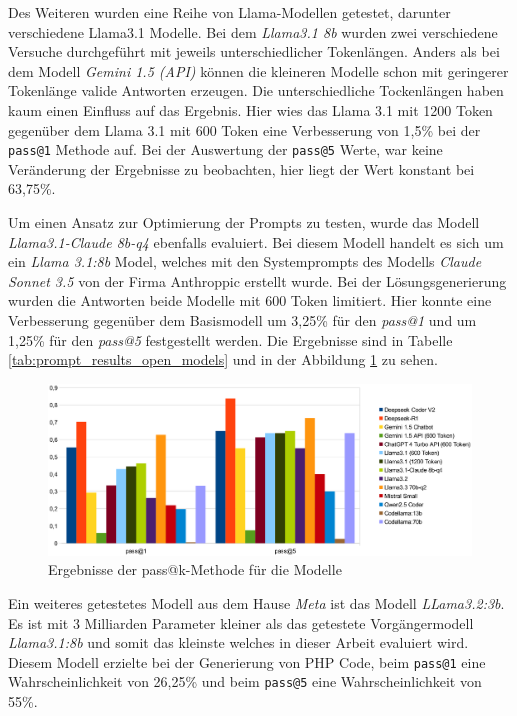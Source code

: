 Des Weiteren wurden eine Reihe von Llama-Modellen getestet, darunter verschiedene Llama3.1 Modelle. Bei dem \textit{Llama3.1 8b} wurden zwei verschiedene Versuche durchgeführt mit jeweils unterschiedlicher Tokenlängen. Anders als bei dem Modell \textit{Gemini 1.5 (API)} können die kleineren Modelle schon mit geringerer Tokenlänge valide Antworten erzeugen. Die unterschiedliche Tockenlängen haben kaum einen Einfluss auf das Ergebnis. Hier wies das Llama 3.1 mit 1200 Token gegenüber dem Llama 3.1 mit 600 Token eine Verbesserung von 1,5\% bei der \texttt{pass@1} Methode auf. Bei der Auswertung der \texttt{pass@5} Werte, war keine Veränderung der Ergebnisse zu beobachten, hier liegt der Wert konstant bei 63,75\%.\vspace{0.2cm}

Um einen Ansatz zur Optimierung der Prompts zu testen, wurde das Modell \textit{Llama3.1-Claude 8b-q4} ebenfalls evaluiert. Bei diesem Modell handelt es sich um ein \textit{Llama 3.1:8b} Model, welches mit den Systemprompts des Modells \textit{Claude Sonnet 3.5} von der Firma Anthroppic erstellt wurde. Bei der Lösungsgenerierung wurden die Antworten beide Modelle mit 600 Token limitiert. Hier konnte eine Verbesserung gegenüber dem Basismodell um 3,25\% für den \textit{pass@1} und um 1,25\% für den \textit{pass@5} festgestellt werden. Die Ergebnisse sind in Tabelle \ref{tab:prompt_results_open_models} und in der Abbildung \ref{img:pass_at_k_results_by_llm} zu sehen.\vspace{0.2cm}

\begin{figure}[!ht]
	\includegraphics[width=\textwidth]{content/chapter_evaluation/images/llm_evaluation.eps}
	\centering
	\caption{Ergebnisse der pass@k-Methode für die Modelle}
	\label{img:pass_at_k_results_by_llm}
\end{figure}

Ein weiteres getestetes Modell aus dem Hause \textit{Meta} ist das Modell \textit{LLama3.2:3b}. Es ist mit 3 Milliarden Parameter kleiner als das getestete Vorgängermodell \textit{Llama3.1:8b} und somit das kleinste welches in dieser Arbeit evaluiert wird. Diesem Modell erzielte bei der Generierung von PHP Code, beim \texttt{pass@1} eine Wahrscheinlichkeit von 26,25\% und beim \texttt{pass@5} eine Wahrscheinlichkeit von 55\%.\vspace{0.2cm}


